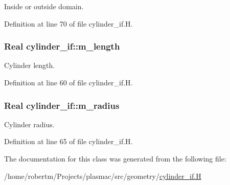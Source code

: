 Inside or outside domain. 



Definition at line 70 of file cylinder\+\_\+if.\+H.

\subsubsection[{\texorpdfstring{m\+\_\+length}{m_length}}]{\setlength{\rightskip}{0pt plus 5cm}Real cylinder\+\_\+if\+::m\+\_\+length\hspace{0.3cm}{\ttfamily [protected]}}\hypertarget{classcylinder__if_a4c1e727e668cee381abbb6b234a2ddf7}{}\label{classcylinder__if_a4c1e727e668cee381abbb6b234a2ddf7}


Cylinder length. 



Definition at line 60 of file cylinder\+\_\+if.\+H.

\subsubsection[{\texorpdfstring{m\+\_\+radius}{m_radius}}]{\setlength{\rightskip}{0pt plus 5cm}Real cylinder\+\_\+if\+::m\+\_\+radius\hspace{0.3cm}{\ttfamily [protected]}}\hypertarget{classcylinder__if_ae84dac74e682302f5504ea056f423453}{}\label{classcylinder__if_ae84dac74e682302f5504ea056f423453}


Cylinder radius. 



Definition at line 65 of file cylinder\+\_\+if.\+H.



The documentation for this class was generated from the following file\+:\begin{DoxyCompactItemize}
\item 
/home/robertm/\+Projects/plasmac/src/geometry/\hyperlink{cylinder__if_8H}{cylinder\+\_\+if.\+H}\end{DoxyCompactItemize}
